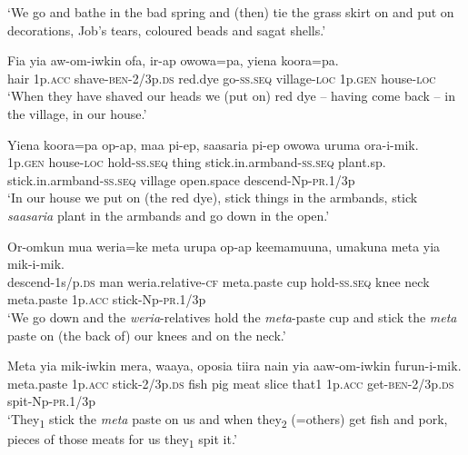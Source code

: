 \glt ‘We go and bathe in the bad spring and (then) tie the grass skirt on and put on decorations, Job’s tears, coloured beads and sagat shells.’ \\
\z


\ea
\gll  Fia  yia  aw-om-iwkin  ofa,  ir-ap  owowa=pa,              yiena  koora=pa. \\
hair  1p.\textsc{acc}  shave-\textsc{ben}-2/3p.\textsc{ds}  red.dye  go-\textsc{ss.seq}  village-\textsc{loc} 1p.\textsc{gen}  house-\textsc{loc} \\


\glt ‘When they have shaved our heads we (put on) red dye – having come back – in the village, in our house.’ \\
\z


\ea
\gll  Yiena  koora=pa  op-ap,  maa  pi-ep,                      saasaria  pi-ep  owowa  uruma  ora-i-mik. \\
1p.\textsc{gen}  house-\textsc{loc}  hold-\textsc{ss.seq}  thing  stick.in.armband-\textsc{ss.seq}  plant.sp.  stick.in.armband-\textsc{ss.seq}  village  open.space  descend-Np-\textsc{pr}.1/3p \\


\glt ‘In our house we put on (the red dye), stick things in the armbands, stick \textit{saasaria} plant in the armbands and go down in the open.’ \\
\z


\ea
\gll  Or-omkun  mua  weria=ke  meta  urupa  op-ap                      keemamuuna,  umakuna  meta  yia  mik-i-mik. \\
descend-1s/p.\textsc{ds}  man  weria.relative-\textsc{cf}  meta.paste  cup  hold-\textsc{ss.seq}  knee  neck  meta.paste  1p.\textsc{acc}  stick-Np-\textsc{pr}.1/3p \\


\glt ‘We go down and the \textit{weria}{}-relatives hold the \textit{meta}{}-paste cup and stick the \textit{meta} paste on (the back of) our knees and on the neck.’ \\
\z


\ea
\gll  Meta  yia  mik-iwkin  mera,  waaya,  oposia  tiira  nain    yia  aaw-om-iwkin  furun-i-mik. \\
meta.paste  1p.\textsc{acc}  stick-2/3p.\textsc{ds}  fish  pig  meat  slice  that1  1p.\textsc{acc}  get-\textsc{ben}-2/3p.\textsc{ds}  spit-Np-\textsc{pr}.1/3p \\


\glt ‘They\textsubscript{1} stick the \textit{meta} paste on us and when they\textsubscript{2} (=others) get fish and pork, pieces of those meats for us they\textsubscript{1} spit it.’ \\
\z


